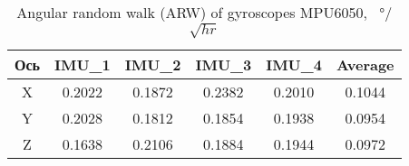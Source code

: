 \begin{table}[h!]
	\centering
	\caption{Angular random walk (ARW) of gyroscopes MPU6050, \SI[per-mode=symbol]{}{\degree}/$\sqrt{hr}$}
	\begin{tabular}{| c | c | c | c | c | c |}
	\hline
	Ось & IMU\_1 & IMU\_2 & IMU\_3 & IMU\_4 & Average \\ \hline
	X & 0.2022 & 0.1872 & 0.2382 & 0.2010 & 0.1044 \\ \hline
	Y & 0.2028 & 0.1812 & 0.1854 & 0.1938 & 0.0954 \\ \hline
	Z & 0.1638 & 0.2106 & 0.1884 & 0.1944 & 0.0972 \\
	\hline
	\end{tabular}
	\label{table:gyro_arw}
\end{table}


\newpage